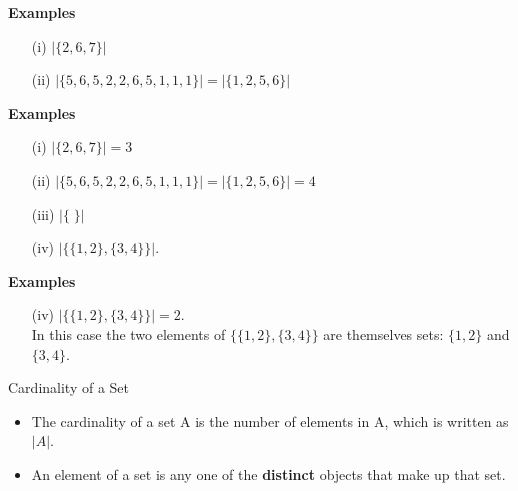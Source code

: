 \documentclass[]{article}
\begin{document}


\textbf{Examples}
\begin{itemize}
\item[(i)] $|\{2,6,7\}| $

\item[(ii)] $|\{5,6,5,2,2,6,5,1,1,1\}| = |\{1,2,5,6\}| $
\end{itemize}





\textbf{Examples}
\begin{itemize}
\item[(i)] $|\{2,6,7\}| = 3$

\item[(ii)] $|\{5,6,5,2,2,6,5,1,1,1\}| = |\{1,2,5,6\}| = 4$

\item[(iii)] $|\{ \; \}| $

\item[(iv)] $|\{\{1,2\},\{3,4\}\}| $.
\end{itemize}





\textbf{Examples}
\begin{itemize}

\item[(iv)] $|\{\{1,2\},\{3,4\}\}| = 2$. \\ \vspace{0.4cm} In this case the two elements of $\{\{1,2\},\{3,4\}\}$ are themselves sets: $\{1,2\}$ and $\{3,4\}$.
\end{itemize}

\newpage



{Cardinality of a Set}
\Large
\vspace{-1cm}
\begin{itemize}
\item The cardinality of a set A is the number of elements in A, which is written as $|A|$.
\item An element of a set is any one of the \textbf{distinct} objects that make up that set.

\end{itemize}
\end{document}
